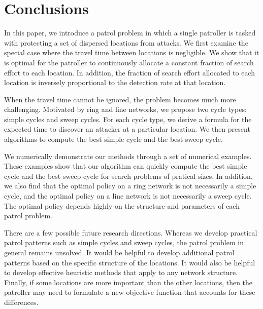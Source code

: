 \documentclass[11pt,a4paper]{article}
\begin{document}
\section{Conclusions} \label{sec: conclusions and further work}
In this paper, we introduce a patrol problem in which a single patroller is tasked with protecting a set of dispersed locations from attacks. 
We first examine the special case where the travel time between locations is negligible.
We show that it is optimal for the patroller to continuously allocate a constant fraction of search effort to each location.
In addition, the fraction of search effort allocated to each location is inversely proportional to the detection rate at that location.


When the travel time cannot be ignored, the problem becomes much more challenging.
Motivated by ring and line networks, we propose two cycle types: simple cycles and sweep cycles.
For each cycle type, we derive a formula for the expected time to discover an attacker at a particular location.
We then present algorithms to compute the best simple cycle and the best sweep cycle.



We numerically demonstrate our methods through a set of numerical examples.
These examples show that our algorithm can quickly compute the best simple cycle and the best sweep cycle for search problems of pratical sizes.
In addition, we also find that the optimal policy on a ring network is not necessarily a simple cycle, and the optimal policy on a line network is not necessarily a sweep cycle.
The optimal policy depends highly on the structure and parameters of each patrol problem.



There are a few possible future research directions.
Whereas we develop practical patrol patterns such as simple cycles and sweep cycles, the patrol problem in general remains unsolved.
It would be helpful to develop additional patrol patterns based on the specific structure of the locations.
It would also be helpful to develop effective heuristic methods that apply to any network structure.
Finally, if some locations are more important than the other locations, then the patroller may need to formulate a new objective function that accounts for these differences.
\end{document}
